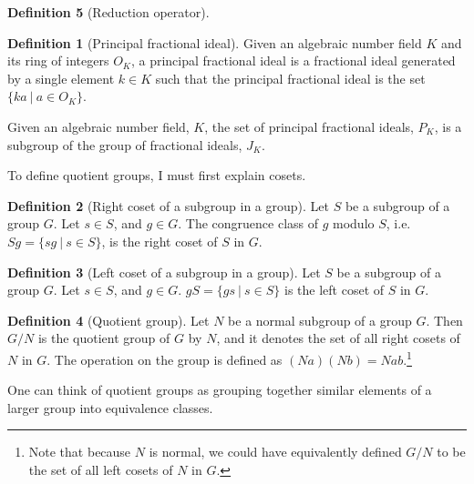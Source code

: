 \documentclass{article}
\theoremstyle{definition}
\newtheorem{definition}{Definition}[section]
\theoremstyle{theorem}
\theoremstyle{example}
\theoremstyle{corollary}
\begin{document}
\begin{definition}[Reduction operator]
\bigskip

\theoremstyle{definition}
\begin{definition}[Principal fractional ideal]
Given an algebraic number field \(K\) and its ring of integers \(O_{K}\), a principal fractional ideal is a fractional ideal generated by a single element \(k \in K\) such that the principal fractional ideal is the set \(\{k a \ | \ a \in O_{K} \} \).
\end{definition}

\bigskip

Given an algebraic number field, \(K\), the set of principal fractional ideals, \(P_{K}\), is a subgroup of the group of fractional ideals, \(J_{K}\).

\bigskip

To define quotient groups, I must first explain cosets.

\bigskip

\theoremstyle{definition}
\begin{definition}[Right coset of a subgroup in a group]
Let \(S\) be a subgroup of a group \(G\). Let \(s \in S\), and \(g \in G\). The congruence class of \(g\) modulo \(S\), i.e. \(Sg = \{ sg \ | \ s \in S\}\), is the right coset of \(S\) in \(G\).
\end{definition}

\bigskip

\theoremstyle{definition}
\begin{definition}[Left coset of a subgroup in a group]
Let \(S\) be a subgroup of a group \(G\). Let \(s \in S\), and \(g \in G\). \(gS = \{ gs \ | \ s \in S\}\) is the left coset of \(S\) in \(G\).
\end{definition}

\bigskip

\theoremstyle{definition}
\begin{definition}[Quotient group]
Let \(N\) be a normal subgroup of a group \(G\). Then \(G/N\) is the quotient group of \(G\) by \(N\), and it denotes the set of all right cosets of \(N\) in \(G\). The operation on the group is defined as \((Na)(Nb) = Nab\).\footnote{Note that because \(N\) is normal, we could have equivalently defined \(G/N\) to be the set of all left cosets of \(N\) in \(G\).}
\end{definition}

\bigskip

One can think of quotient groups as grouping together similar elements of a larger group into equivalence classes.


\end{definition}
\end{document}
